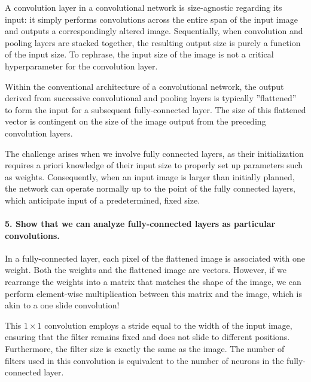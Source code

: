 \documentclass{article}
\theoremstyle{plain}%
\theoremstyle{definition}
\theoremstyle{remark}
\begin{document}

A convolution layer in a convolutional network is size-agnostic regarding its input: it simply performs convolutions across the entire span of the input image and outputs a correspondingly altered image. Sequentially, when convolution and pooling layers are stacked together, the resulting output size is purely a function of the input size. To rephrase, the input size of the image is not a critical hyperparameter for the convolution layer.

Within the conventional architecture of a convolutional network, the output derived from successive convolutional and pooling layers is typically ''flattened'' to form the input for a subsequent fully-connected layer. The size of this flattened vector is contingent on the size of the image output from the preceding convolution layers.

The challenge arises when we involve fully connected layers, as their initialization requires a priori knowledge of their input size to properly set up parameters such as weights. Consequently, when an input image is larger than initially planned, the network can operate normally up to the point of the fully connected layers, which anticipate input of a predetermined, fixed size.

\paragraph{5. Show that we can analyze fully-connected layers as particular convolutions.}
In a fully-connected layer, each pixel of the flattened image is associated with one weight. Both the weights and the flattened image are vectors. However, if we rearrange the weights into a matrix that matches the shape of the image, we can perform element-wise multiplication between this matrix and the image, which is akin to a one slide convolution!

This $1 \times 1$ convolution employs a stride equal to the width of the input image, ensuring that the filter remains fixed and does not slide to different positions. Furthermore, the filter size is exactly the same as the image. The number of filters used in this convolution is equivalent to the number of neurons in the fully-connected layer.
\end{document}
